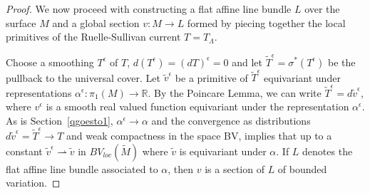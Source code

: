 \documentclass{ip-journal}
\newtheorem{corollary}[theorem]{Corollary}
\theoremstyle{definition}
\newtheorem{remark}[theorem]{Remark}
\numberwithin{equation}{section}
\newcommand{\R}{\mathbb R}
\begin{document}
\begin{proof}
 
 
We now proceed with constructing a flat affine  line bundle $L$ over the surface $M$ and a global section $v: M \rightarrow L$ formed by piecing together the local primitives of the Ruelle-Sullivan current $T=T_\Lambda$.
 
Choose a smoothing $T^\epsilon$ of $T$,
 $d (T^\epsilon)=(d T)^\epsilon=0$
and let
 $\tilde T^\epsilon =\sigma^*(T^\epsilon)$ be the pullback to the universal cover. Let  $\tilde v^\epsilon$ be a primitive of  $\tilde T^\epsilon $ equivariant under representations
 $\alpha^\epsilon: \pi_1(M) \rightarrow \R.$
 By the Poincare Lemma, we can write
 $\tilde T^\epsilon=   d\tilde v^\epsilon$,
 where $v^\epsilon$ is a smooth real valued function equivariant under the representation 
 $\alpha^\epsilon$. As is Section~\ref{qgoesto1},
 $\alpha^\epsilon \rightarrow \alpha$ and
 the convergence as distributions $d\tilde v^\epsilon=\tilde T^\epsilon \rightarrow T$ and weak compactness in the space BV, implies that up to a constant $\tilde v^\epsilon \rightharpoonup \tilde v$  in $BV_{loc}(\tilde M)$ where $\tilde v$ is equivariant under $\alpha$.
  If $L$ denotes the flat affine line bundle associated to 
 $\alpha$, then $v$ is a section of $L$ of bounded variation.
\end{proof}
\end{document}
